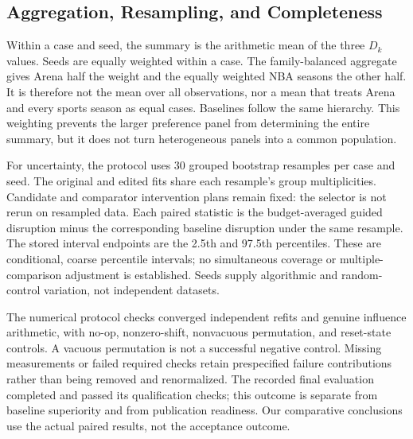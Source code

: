 \documentclass{article}
\begin{document}
\subsection{Aggregation, Resampling, and Completeness}
Within a case and seed, the summary is the arithmetic mean of the three $D_k$ values. Seeds are equally weighted within a case. The family-balanced aggregate gives Arena half the weight and the equally weighted NBA seasons the other half. It is therefore not the mean over all observations, nor a mean that treats Arena and every sports season as equal cases. Baselines follow the same hierarchy. This weighting prevents the larger preference panel from determining the entire summary, but it does not turn heterogeneous panels into a common population.

For uncertainty, the protocol uses 30 grouped bootstrap resamples per case and seed. The original and edited fits share each resample's group multiplicities. Candidate and comparator intervention plans remain fixed: the selector is not rerun on resampled data. Each paired statistic is the budget-averaged guided disruption minus the corresponding baseline disruption under the same resample. The stored interval endpoints are the 2.5th and 97.5th percentiles. These are conditional, coarse percentile intervals; no simultaneous coverage or multiple-comparison adjustment is established. Seeds supply algorithmic and random-control variation, not independent datasets.

The numerical protocol checks converged independent refits and genuine influence arithmetic, with no-op, nonzero-shift, nonvacuous permutation, and reset-state controls. A vacuous permutation is not a successful negative control. Missing measurements or failed required checks retain prespecified failure contributions rather than being removed and renormalized. The recorded final evaluation completed and passed its qualification checks; this outcome is separate from baseline superiority and from publication readiness. Our comparative conclusions use the actual paired results, not the acceptance outcome.
\end{document}
